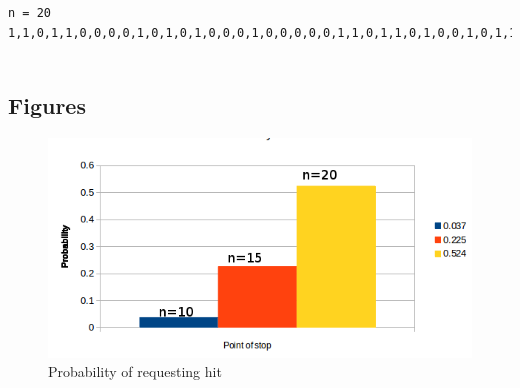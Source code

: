 \documentclass[11pt]{article}
\begin{document}
\begin{lstlisting}[caption=Results of testing stop-at-n with 1000 hands and different values of n, label=stopatn]
n = 20
1,1,0,1,1,0,0,0,0,1,0,1,0,1,0,0,0,1,0,0,0,0,0,1,1,0,1,1,0,1,0,0,1,0,1,1,0,0,0,0,1,0,0,1,1,0,1,1,0,0,1,0,1,1,1,0,0,1,1,1,1,0,1,1,1,0,1,1,1,1,1,1,0,0,0,1,1,1,0,0,0,1,1,1,0,1,0,1,0,0,1,1,0,0,1,1,1,1,0,0,0,1,1,0,0,0,0,1,0,1,1,0,0,1,0,1,1,0,0,0,0,0,1,0,0,0,1,1,0,0,1,0,0,0,0,1,1,1,0,0,0,1,0,0,0,1,0,0,1,1,0,1,0,1,1,1,1,1,0,1,1,0,0,0,1,1,0,0,0,1,1,1,1,1,1,0,0,1,1,1,1,1,0,1,1,1,0,0,0,1,1,1,1,0,0,0,1,0,0,1,0,0,1,1,1,1,0,0,1,0,0,0,1,1,0,1,0,1,0,0,0,1,0,1,1,0,1,0,0,0,0,0,0,0,0,1,1,0,1,0,1,1,1,0,1,0,0,0,1,1,0,1,1,0,1,0,0,1,0,1,1,1,1,0,0,0,1,0,1,0,1,1,0,0,0,1,1,0,1,0,0,1,1,1,0,1,1,1,0,1,1,0,0,0,0,0,1,1,1,1,1,0,0,1,0,0,1,1,0,0,0,1,1,1,0,1,1,1,1,0,0,1,0,0,1,1,0,0,0,0,0,1,0,1,1,0,0,0,0,1,1,0,0,0,1,1,0,1,1,1,1,1,1,0,0,1,0,1,1,1,0,1,1,1,1,1,1,0,0,1,1,0,0,1,1,0,0,1,1,1,1,0,1,1,1,0,1,0,1,0,0,1,0,1,1,1,1,1,1,1,0,1,0,0,0,1,0,1,0,0,1,0,1,0,1,1,0,1,1,1,0,1,0,1,0,1,0,1,0,0,1,1,0,0,1,0,1,0,0,0,0,1,0,1,0,1,0,1,0,1,0,0,0,0,1,0,0,1,1,1,0,0,1,1,1,0,0,0,1,1,0,0,0,0,1,1,1,0,1,1,1,0,1,0,1,1,1,1,0,1,1,0,1,0,1,1,0,1,1,1,1,1,0,0,1,0,0,1,1,1,0,0,0,1,1,1,0,0,1,0,0,0,0,0,1,1,1,1,1,1,1,1,1,1,0,0,1,1,0,0,1,1,0,1,0,0,1,1,1,1,1,1,1,0,1,1,0,1,1,0,0,1,1,1,1,0,0,0,0,0,1,0,0,0,0,1,0,1,0,0,1,0,1,1,1,1,1,1,1,1,1,1,0,1,0,1,1,0,0,0,1,0,1,1,0,0,1,1,1,0,0,1,0,0,1,0,1,0,1,0,0,0,0,1,1,0,1,0,0,1,1,0,1,1,1,0,0,1,1,1,1,0,0,1,1,1,0,0,1,0,1,0,0,0,0,0,1,0,0,1,0,1,0,0,1,0,0,0,1,0,1,0,0,1,1,1,1,0,0,0,0,1,0,1,1,1,1,0,0,0,1,1,1,1,0,1,1,1,1,0,0,1,0,1,0,0,1,0,0,0,0,1,1,0,1,0,1,0,1,1,0,0,1,0,0,1,1,0,1,1,0,1,0,1,0,1,0,0,1,0,1,1,0,1,1,1,1,1,0,0,0,0,0,0,0,0,0,0,1,0,1,0,0,1,1,0,1,1,0,1,1,1,1,0,0,1,1,1,0,0,0,0,0,1,0,1,0,0,1,1,1,0,1,0,1,1,0,0,0,0,0,1,1,1,1,0,1,0,0,1,1,1,0,0,0,0,1,0,0,1,0,0,1,1,1,0,0,1,1,1,1,1,1,1,1,0,1,1,0,1,1,1,1,1,1,0,1,0,1,1,1,1,1,1,0,0,1,1,1,0,0,0,1,0,0,0,1,0,1,0,0,1,1,0,1,0,1,1,1,1,0,1,0,0,1,0,0,1,1,1,1,1,1,0,1,0,1,0,1,0,1,1,1,1,0,1,1,1,1,0,1,0,0,1,0,0,1,0,0,1,0,0,1,1,1,1,0,0,0,1,0,0,0,0,0,1,1,1,0,0,0,1,0,0,1,1,0,0,0,1,1,1,0,1,1,1,1,1,0,1,0,0,0,0,0,1,0,0,1,1,1,1,0,1,1,0,0,1,0,1,0,1,0,1,0,1,0,1,1,1,1,1,0,1,1,1,0,0,0,0
	
	\end{lstlisting}
	
	
	\subsection{Figures}
		
			\begin{figure}[h]
				\centering
				\includegraphics[scale=1]{stop-at.png}
				\caption{Probability of requesting hit}
				\label{graph1}
			\end{figure}
			
\end{document}
